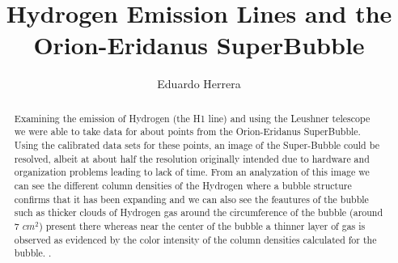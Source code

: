 \documentclass[12 pt]{article}
\begin{document}
\title{Hydrogen Emission Lines and the Orion-Eridanus SuperBubble}
\author{Eduardo Herrera}

\maketitle
  
\begin{abstract}
    Examining the emission of Hydrogen (the H1 line) and using the
Leushner telescope we were able to take data for about  points from
the Orion-Eridanus SuperBubble. Using the calibrated data sets for these points,
an image of the Super-Bubble could be resolved, albeit at about half the
resolution originally intended due to hardware and organization problems
leading to lack of time. From an analyzation
of this image we can see the different column densities of the Hydrogen
where a bubble structure confirms that it has been expanding
and we can also see the feautures of the bubble such as thicker clouds of
Hydrogen gas around the circumference of the bubble (around 7 $cm^2$)
present there whereas near the center of the bubble a thinner
layer of gas is observed as evidenced by the color intensity of the column densities calculated for the
bubble. . 
\end{abstract}
\end{document}
